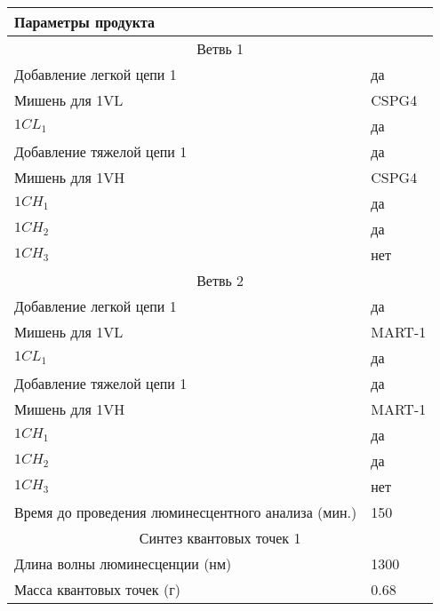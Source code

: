 \begin{enumerate}
    \begin{table}[H]
        \begin{center}
            \begin{tabular}{|p{9cm}|p{4cm}|}
                \hline
                \multicolumn{2}{|l|}{Параметры продукта} \\
                \hline
                \multicolumn{2}{|c|}{Ветвь 1} \\
                \hline
                Добавление легкой цепи 1&да \\
                \hline
                Мишень для 1VL&CSPG4 \\
                \hline
                $1CL_1$	&да \\
                \hline
                Добавление тяжелой цепи 1&да\\
                \hline
                Мишень для 1VH&CSPG4 \\
                \hline
                $1CH_1$ & да \\
                \hline
                $1CH_2$ & да \\
                \hline
                $1CH_3$ & нет \\
                \hline
                \multicolumn{2}{|c|}{Ветвь 2} \\
                \hline
                Добавление легкой цепи 1&	да \\
                \hline
                Мишень для 1VL	&MART-1 \\
                \hline
                $1CL_1$&	да \\
                \hline
                Добавление тяжелой цепи 1	&да \\
                \hline
                Мишень для 1VH	&MART-1 \\
                \hline
                $1CH_1$	&да \\
                \hline
                $1CH_2$	&да \\
                \hline
                $1CH_3$	&нет \\
                \hline
                Время до проведения люминесцентного анализа (мин.)	&150 \\
                \hline
                \multicolumn{2}{|c|}{Синтез квантовых точек 1} \\
                \hline
                Длина волны люминесценции (нм)&	1300 \\
                \hline
                Масса квантовых точек (г)&	0.68 \\

\end{tabular}
\end{center}
\end{table}
\end{enumerate}
